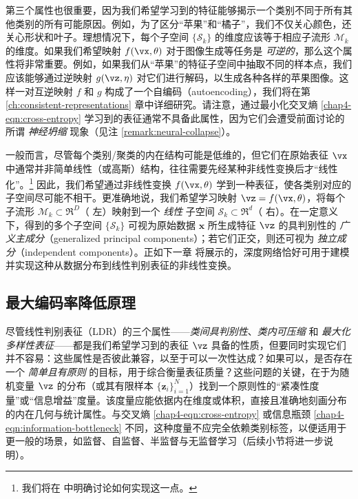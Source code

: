 \documentclass[../../book-main_zh.tex]{subfiles}
\begin{document}
第三个属性也很重要，因为我们希望学习到的特征能够揭示一个类别不同于所有其他类别的所有可能原因。例如，为了区分“苹果”和“橘子”，我们不仅关心颜色，还关心形状和叶子。理想情况下，每个子空间 $\{\mathcal{S}_k\}$ 的维度应该等于相应子流形 $\mathcal{M}_k$ 的维度。如果我们希望映射 $f(\vx,\theta)$ 对于图像生成等任务是 {\em 可逆的}，那么这个属性将非常重要。例如，如果我们从“苹果”的特征子空间中抽取不同的样本点，我们应该能够通过逆映射 $g(\vz, \eta)$ 对它们进行解码，以生成各种各样的苹果图像。这样一对互逆映射 $f$ 和 $g$ 构成了一个自编码（autoencoding），我们将在第 \ref{ch:consistent-representations} 章中详细研究。请注意，通过最小化交叉熵 \eqref{chap4-eqn:cross-entropy} 学习到的表征通常不具备此属性，因为它们会遭受前面讨论的所谓 {\em 神经坍缩} 现象（见注 \ref{remark:neural-collapse}）。

一般而言，尽管每个类别/聚类的内在结构可能是低维的，但它们在原始表征 $\vx$ 中通常并非简单线性（或高斯）结构，往往需要先经某种非线性变换后才“线性化”。\footnote{我们将在  中明确讨论如何实现这一点。} 因此，我们希望通过非线性变换 $f(\vx,\theta)$ 学到一种表征，使各类别对应的子空间尽可能不相干。更准确地说，我们希望学习映射 $\vz = f(\vx,\theta)$，将每个子流形 $\mathcal{M}_k \subset \Re^D$（ 左）映射到一个 {\em 线性} 子空间 $\mathcal{S}_k \subset \Re^d$（ 右）。在一定意义下，得到的多个子空间 $\{\mathcal{S}_k\}$ 可视为原始数据 $\bm x$ 所生成特征 $\vz$ 的具判别性的 {\em 广义主成分}（generalized principal components）\cite{GPCA}；若它们正交，则还可视为 {\em 独立成分}（independent components）\cite{hyvarinen2000independent}。正如下一章  将展示的，深度网络恰好可用于建模并实现这种从数据分布到线性判别表征的非线性变换。

\subsection{最大编码率降低原理}\label{subsec:MCR2}

尽管线性判别表征（LDR）的三个属性——{\em 类间具判别性}、{\em 类内可压缩} 和 {\em 最大化多样性表征}——都是我们希望学习到的表征 $\vz$ 具备的性质，但要同时实现它们并不容易：这些属性是否彼此兼容，以至于可以一次性达成？如果可以，是否存在一个 {\em 简单且有原则} 的目标，用于综合衡量表征质量？这些问题的关键，在于为随机变量 $\vz$ 的分布（或其有限样本 $\{\bm z_i\}_{i=1}^N$）找到一个原则性的“紧凑性度量”或“信息增益”度量。该度量应能依据内在维度或体积，直接且准确地刻画分布的内在几何与统计属性。与交叉熵 \eqref{chap4-eqn:cross-entropy} 或信息瓶颈 \eqref{chap4-eqn:information-bottleneck} 不同，这种度量不应完全依赖类别标签，以便适用于更一般的场景，如监督、自监督、半监督与无监督学习（后续小节将进一步说明）。
\end{document}
